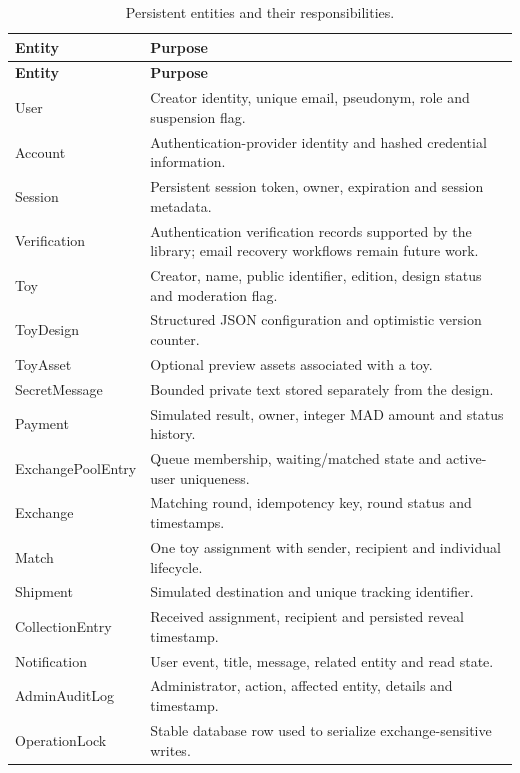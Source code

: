 \documentclass[11pt,a4paper]{article}
\begin{document}
\begin{longtable}{p{3.5cm}p{10.2cm}}
\caption{Persistent entities and their responsibilities.}\\
\toprule\textbf{Entity} & \textbf{Purpose}\\
\midrule\endfirsthead
\toprule\textbf{Entity} & \textbf{Purpose}\\
\midrule\endhead
User & Creator identity, unique email, pseudonym, role and suspension flag.\\
Account & Authentication-provider identity and hashed credential information.\\
Session & Persistent session token, owner, expiration and session metadata.\\
Verification & Authentication verification records supported by the library; email recovery workflows remain future work.\\
Toy & Creator, name, public identifier, edition, design status and moderation flag.\\
ToyDesign & Structured JSON configuration and optimistic version counter.\\
ToyAsset & Optional preview assets associated with a toy.\\
SecretMessage & Bounded private text stored separately from the design.\\
Payment & Simulated result, owner, integer MAD amount and status history.\\
ExchangePoolEntry & Queue membership, waiting/matched state and active-user uniqueness.\\
Exchange & Matching round, idempotency key, round status and timestamps.\\
Match & One toy assignment with sender, recipient and individual lifecycle.\\
Shipment & Simulated destination and unique tracking identifier.\\
CollectionEntry & Received assignment, recipient and persisted reveal timestamp.\\
Notification & User event, title, message, related entity and read state.\\
AdminAuditLog & Administrator, action, affected entity, details and timestamp.\\
OperationLock & Stable database row used to serialize exchange-sensitive writes.\\
\bottomrule
\end{longtable}
\end{document}

